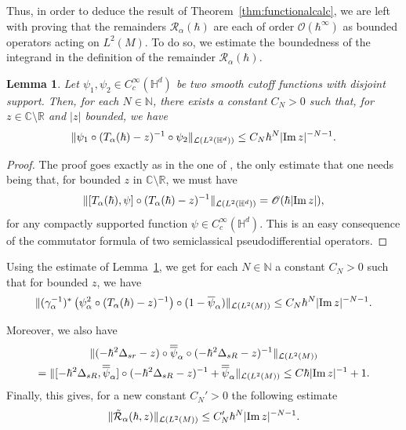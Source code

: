 \documentclass[12pt,a4paper]{amsart}
\theoremstyle{plain}
\newtheorem{lemma}[theorem]{Lemma}
\theoremstyle{definition}
\theoremstyle{remark}
\numberwithin{equation}{section}
\theoremstyle{definition}
\def\R{{\mathbb R}}%
\def\C{{\mathbb C}}%
\def\N{{\mathbb N}}%
\def \O{\mathscr{O}}
\def \Heis{\mathbb{H}}
\numberwithin{equation}{section}
\begin{document}
\vspace{0.25cm}

Thus, in order to deduce the result of Theorem~\ref{thm:functionalcalc}, we are left with proving that the remainders $\mathcal{R}_\alpha(\hbar)$ are each of order $\O(\hbar^\infty)$ as bounded operators acting on $L^2(M)$. To do so, we estimate the boundedness of the integrand in the definition of the remainder $\mathcal{R}_\alpha(\hbar)$.

\begin{lemma}
    \label{lem:easyestimate}
    Let $\psi_1,\psi_2\in C_c^\infty(\Heis^d)$ be two smooth cutoff functions with disjoint support. Then, for each $N\in\N$, there exists a constant $C_N>0$ such that, for $z\in \C\setminus\R$ and $|z|$ bounded, we have
    \begin{equation*}
        \|\psi_1\circ (T_\alpha(\hbar)-z)^{-1}\circ \psi_2\|_{\mathcal{L}(L^2(\Heis^d))} \leq C_N \hbar^N |{\rm Im}\,z|^{-N-1}.
    \end{equation*}
\end{lemma}

\begin{proof}
    The proof goes exactly as in the one of \cite[Lemma 4.3]{BK}, the only estimate that one needs being that, for bounded $z$ in $\C\setminus\R$, we must have
    \begin{equation*}
        \|[T_\alpha(\hbar),\psi]\circ (T_\alpha(\hbar)-z)^{-1}\|_{\mathcal{L}(L^2(\Heis^d))} = \O(\hbar |{\rm Im}\,z|),
    \end{equation*}
    for any compactly supported function $\psi\in C_c^\infty(\Heis^d)$. This is an easy consequence of the commutator formula of two semiclassical pseudodifferential operators.
\end{proof}

Using the estimate of Lemma~\ref{lem:easyestimate}, we get for each $N\in\N$ a constant $C_N>0$ such that for bounded $z$, we have
\begin{equation*}
    \|(\gamma_\alpha^{-1})^* \left(\psi_\alpha^2\circ (T_\alpha(\hbar)-z)^{-1}\right) \circ (1-\overline{\psi}_\alpha)\|_{\mathcal{L}(L^2(M))} \le C_N \hbar^N |{\rm Im}\,z|^{-N-1}.
\end{equation*}

Moreover, we also have
\begin{multline*}
    \|(-\hbar^2 \Delta_{sr}-z)\circ \overline{\overline{\psi}}_\alpha\circ (-\hbar^2\Delta_{sR}-z)^{-1}\|_{\mathcal{L}(L^2(M))} \\= \|[-\hbar^2 \Delta_{sR},\overline{\overline{\psi}}_\alpha]\circ (-\hbar^2\Delta_{sR}-z)^{-1} + \overline{\overline{\psi}}_\alpha\|_{\mathcal{L}(L^2(M))} \leq C \hbar|{\rm Im}\,z|^{-1} + 1.
\end{multline*}
Finally, this gives, for a new constant $C_N'>0$ the following estimate
\begin{equation*}
    \|\tilde{\mathcal{R}}_\alpha(\hbar,z)\|_{\mathcal{L}(L^2(M))}\leq C_N'\hbar^N |{\rm Im}\,z|^{-N-1}.
\end{equation*}
\end{document}
